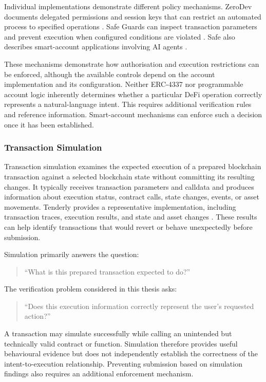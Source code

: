 Individual implementations demonstrate different policy
mechanisms. ZeroDev documents delegated permissions and
session keys that can restrict an automated process to
specified operations
\cite{zeroDevPermissionsSessionKeys2026}.
Safe Guards can inspect transaction parameters and prevent
execution when configured conditions are violated
\cite{safeSmartAccountGuards2026}.
Safe also describes smart-account applications involving
AI agents \cite{safeAIAgentsSmartAccounts2026}.

These mechanisms demonstrate how authorisation and execution
restrictions can be enforced, although the available controls
depend on the account implementation and its configuration.
Neither ERC-4337 nor programmable account logic inherently
determines whether a particular DeFi operation correctly
represents a natural-language intent. This requires additional
verification rules and reference information. Smart-account
mechanisms can enforce such a decision once it has been
established.

\subsubsection{Transaction Simulation}

Transaction simulation examines the expected execution of
a prepared blockchain transaction against a selected
blockchain state without committing its resulting changes.
It typically receives transaction parameters and calldata
and produces information about execution status, contract
calls, state changes, events, or asset movements. Tenderly provides a representative implementation, including
transaction traces, execution results, and state and asset
changes \cite{tenderlyTransactionSimulation2026}.
These results can help identify transactions that would
revert or behave unexpectedly before submission.

Simulation primarily answers the question:

\begin{quote}
``What is this prepared transaction expected to do?''
\end{quote}

The verification problem considered in this thesis asks:

\begin{quote}
``Does this execution information correctly represent the
user's requested action?''
\end{quote}

A transaction may simulate successfully while calling an
unintended but technically valid contract or function.
Simulation therefore provides useful behavioural evidence
but does not independently establish the correctness of
the intent-to-execution relationship. Preventing submission
based on simulation findings also requires an additional
enforcement mechanism.

